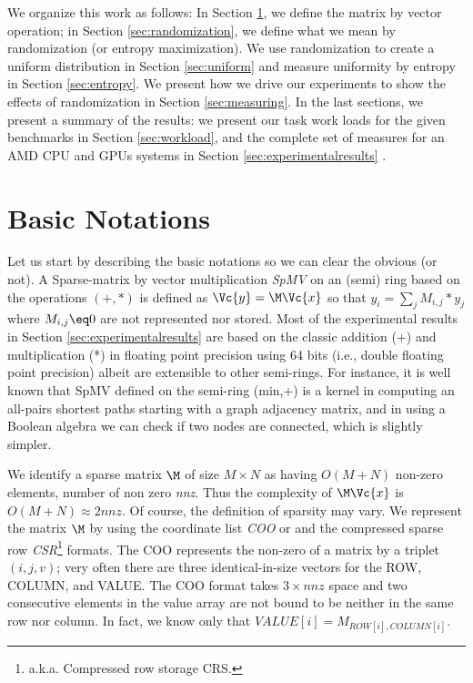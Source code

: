 \documentclass[manuscript,screen]{acmart}
\begin{document}
We organize this work as follows: In Section \ref{sec:notations}, we
define the matrix by vector operation; in Section
\ref{sec:randomization}, we define what we mean by randomization (or
entropy maximization). We use randomization to create a uniform
distribution in Section \ref{sec:uniform} and measure uniformity
by entropy in Section \ref{sec:entropy}. We present how we drive our
experiments to show the effects of randomization in Section
\ref{sec:measuring}. In the last sections, we present a summary of the
results: we present our task work loads for the given benchmarks in Section
\ref{sec:workload}, and the complete set of measures for an AMD CPU
and GPUs systems in Section \ref{sec:experimentalresults} .

\section{Basic Notations}
\label{sec:notations}
Let us start by describing the basic notations so we can clear the
obvious (or not).  A Sparse-matrix by vector multiplication {\em SpMV}
on an (semi) ring based on the operations $(+,*)$ is defined as
$\Vc{y} = \M \Vc{x}$ so that $y_i = \sum_j M_{i,j}*y_j$ where $M_{i,j}
\eq 0$ are not represented nor stored. Most of the experimental
results in Section \ref{sec:experimentalresults} are based on the
classic addition (+) and multiplication (*) in floating point
precision using 64 bits (i.e., double floating point precision) albeit
are extensible to other semi-rings.  For instance, it is well known
that SpMV defined on the semi-ring (min,+) is a kernel in computing an
all-pairs shortest paths starting with a graph adjacency matrix, and
in using a Boolean algebra we can check if two nodes are connected,
which is slightly simpler.

We identify a sparse matrix $\M$ of size $M\times N$ as having
$O(M+N)$ non-zero elements, number of non zero {\em nnz}. Thus the
complexity of $\M \Vc{x}$ is $O(M+N) \approx 2nnz$. Of course, the
definition of sparsity may vary. We represent the matrix $\M$ by using
the coordinate list {\em COO} or and the compressed sparse row {\em
  CSR}\footnote{a.k.a. Compressed row storage {\rm CRS}.}  formats. The
COO represents the non-zero of a matrix by a triplet $(i,j,v)$; very
often there are three identical-in-size vectors for the ROW, COLUMN,
and VALUE. The COO format takes $3\times nnz$ space and two
consecutive elements in the value array are not bound to be neither in
the same row nor column. In fact, we know only that $VALUE[i] =
M_{ROW[i],COLUMN[i]}$.
\end{document}
